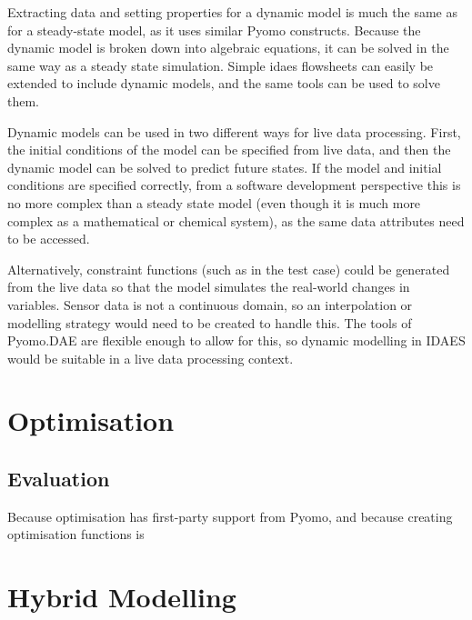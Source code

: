 \documentclass[12pt]{article}
\begin{document}
Extracting data and setting properties for a dynamic model is much the same as for a steady-state model, as it uses similar Pyomo constructs. Because the dynamic model is broken down into algebraic equations, it can be solved in the same way as a steady state simulation. Simple idaes flowsheets can easily be extended to include dynamic models, and the same tools can be used to solve them. 

Dynamic models can be used in two different ways for live data processing. First, the initial conditions of the model can be specified from live data, and then the dynamic model can be solved to predict future states. If the model and initial conditions are specified correctly, from a software development perspective this is no more complex than a steady state model (even though it is much more complex as a mathematical or chemical system), as the same data attributes need to be accessed. 

Alternatively, constraint functions (such as in the test case) could be generated from the live data so that the model simulates the real-world changes in variables. Sensor data is not a continuous domain, so an interpolation or modelling strategy would need to be created to handle this. The tools of Pyomo.DAE are flexible enough to allow for this, so dynamic modelling in IDAES would be suitable in a live data processing context.

\section{Optimisation}

\subsection{Evaluation}


Because optimisation has first-party support from Pyomo, and because creating optimisation functions is



\section{Hybrid Modelling}
\end{document}
